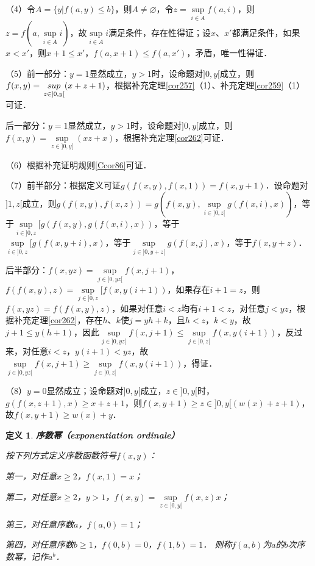 \documentclass[12pt, a4paper, oneside]{book}
\newtheorem{de}{定义}
\begin{document}
			\par
			（4）令$A=\{y|f(a, y)\leq b\}$，则$A\neq \varnothing$，令$z=\mathop{sup}\limits_{i\in A}f(a, i)$，则$z=f(a, \mathop{sup}\limits_{i\in A}i)$，故$\mathop{sup}\limits_{i\in A}i$满足条件，存在性得证；设$x$、$x'$都满足条件，如果$x<x'$，则$x+1\leq x'$，$f(a, x+1)\leq f(a, x')$，矛盾，唯一性得证．
			\par
			（5）前一部分：$y=1$显然成立，$y>1$时，设命题对$]0, y[$成立，则$f(x, y)=\\\mathop{sup}\limits_{z\in ]0, y[}(x+z+1)$，根据补充定理\ref{cor257}（1）、补充定理\ref{cor259}（1）可证．
			\par
			后一部分：$y=1$显然成立，$y>1时$，设命题对$]0, y[$成立，则$f(x, y)=\mathop{sup}\limits_{z\in ]0, y[}(xz+x)$，根据补充定理\ref{cor262}可证．
			\par
			（6）根据补充证明规则\ref{Ccor86}可证．
			\par
			（7）前半部分：根据定义可证$g(f(x, y), f(x, 1))=f(x, y+1)$．设命题对$]1, z[$成立，则$g(f(x, y), f(x, z))=g(f(x, y), \mathop{sup}\limits_{i\in ]0, z[}g(f(x, i), x))$，等于$\mathop{sup}\limits_{i\in ]0, z}[g(f(x, y), g(f(x, i), x))$，等于\\$\mathop{sup}\limits_{i\in ]0, z}[g(f(x, y+i), x)$，等于$\mathop{sup}\limits_{j\in ]0, y+z[}g(f(x, j), x)$，等于$f(x, y+z)$．
			\par
			后半部分：$f(x, yz)=\mathop{sup}\limits_{j\in ]0, yz[}f(x, j+1)$，$f(f(x, y), z)= \mathop{sup}\limits_{j\in ]0, z}[f(x, y(i+1))$，如果存在$i+1=z$，则$f(x, yz)=f(f(x, y), z)$，如果对任意$i<z$均有$i+1<z$，对任意$j<yz$，根据补充定理\ref{cor262}，存在$h$、$k$使$j=yh+k$，且$h<z$，$k<y$，故$j+1\leq y(h+1)$，因此$\mathop{sup}\limits_{j\in ]0, yz[}f(x, j+1)\leq \mathop{sup}\limits_{j\in ]0, z[}f(x, y(i+1))$，反过来，对任意$i<z$，$y(i+1)<yz$，故$\mathop{sup}\limits_{j\in ]0, yz[}f(x, j+1)\geq \mathop{sup}\limits_{j\in ]0, z[}f(x, y(i+1))$，得证．
			\par
			（8）$y=0$显然成立；设命题对$]0, y[$成立，$z\in ]0, y[$时，$g(f(x, z+1), x)\geq x+z+1$，则$f(x, y+1)\geq z\in ]0, y[(w(x)+z+1)$，故$f(x, y+1)\geq w(x)+y$．
									
			\begin{de}
				\textbf{序数幂（exponentiation ordinale）}
				\par
				按下列方式定义序数函数符号$f(x, y)$：
				\par
				第一，对任意$x\geq 2$，$f(x, 1)=x$；
				\par
				第二，对任意$x\geq 2$，$y>1$，$f(x, y)=\mathop{sup}\limits_{z\in ]0, y[}f(x, z)x$；
				\par
				第三，对任意序数$a$，$f(a, 0)=1$；
				\par
				第四，对任意序数$b\geq 1$，$f(0, b)=0$，$f(1, b)=1$．
				则称$f(a, b)$为$a$的$b$次序数幂，记作$a^b$．
			\end{de}
						
\end{document}
